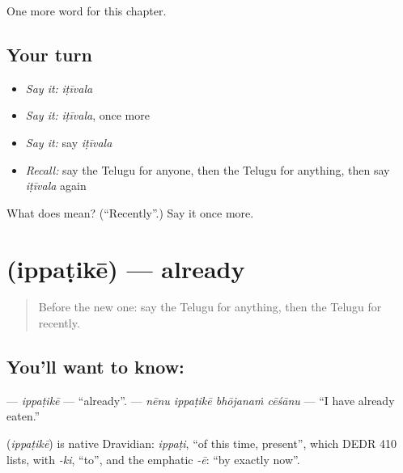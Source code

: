\begin{grammarlens}[title={What you've built}]
One more word for this chapter.
\end{grammarlens}

\subsection*{Your turn}
\begin{itemize}
\raggedright
  \item \emph{Say it:} \emph{iṭīvala}
  \item \emph{Say it:} \emph{iṭīvala}, once more
  \item \emph{Say it:} say \emph{iṭīvala}
  \item \emph{Recall:} say the Telugu for anyone, then the Telugu for anything, then say \emph{iṭīvala} again
\end{itemize}

\begin{tcolorbox}[breakable,colback=teal!4,colframe=teal!35!black,title={Before you move on}]
What does  mean? (\textquotedblleft{}Recently\textquotedblright{}.) Say it once more.
\end{tcolorbox}
\section[\texorpdfstring{\te{ఇప్పటికే} (ippaṭikē)}{ఇప్పటికే (ippaṭikē)}]{ (ippaṭikē) — already}

\label{lesson:TE-C154-ippatike}



\begin{quote}
Before the new one: say the Telugu for anything, then the Telugu for recently.
\end{quote}

\subsection*{You'll want to know: }
\textbf{} — \emph{ippaṭikē} — \textquotedblleft{}already\textquotedblright{}. \textbf{   } — \emph{nēnu ippaṭikē bhōjanaṁ cēśānu} — \textquotedblleft{}I have already eaten.\textquotedblright{}

\begin{cousinweb}
\textbf{} (\emph{ippaṭikē}) is native Dravidian: \emph{ippaṭi}, \textquotedblleft{}of this time, present\textquotedblright{}, which DEDR 410 lists, with \emph{-ki}, \textquotedblleft{}to\textquotedblright{}, and the emphatic \emph{-ē}: \textquotedblleft{}by exactly now\textquotedblright{}.
\end{cousinweb}

